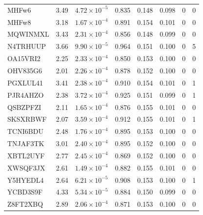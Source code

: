 \begin{landscape}
\begin{longtable}{lrcccccc}
MHFw6     & 3.49 & $4.72\times10^{-5}$ & 0.835 & 0.148 & 0.098 & 0 & 0 \\
MHFw8     & 3.18 & $1.67\times10^{-4}$ & 0.891 & 0.154 & 0.101 & 0 & 0 \\
MQWINMXL  & 3.43 & $2.31\times10^{-4}$ & 0.856 & 0.148 & 0.099 & 0 & 0 \\
N4TRHUUP  & 3.66 & $9.90\times10^{-5}$ & 0.964 & 0.151 & 0.100 & 0 & 5 \\
OA15VRI2  & 2.25 & $2.33\times10^{-4}$ & 0.850 & 0.153 & 0.100 & 0 & 0 \\
OHV835G6  & 2.01 & $2.26\times10^{-4}$ & 0.878 & 0.152 & 0.100 & 0 & 0 \\
PGXLUL41  & 3.41 & $2.38\times10^{-4}$ & 0.910 & 0.154 & 0.101 & 0 & 1 \\
PJR4AHZO  & 2.38 & $3.72\times10^{-4}$ & 0.925 & 0.151 & 0.099 & 0 & 1 \\
QSBZPFZI  & 2.11 & $1.65\times10^{-4}$ & 0.876 & 0.155 & 0.101 & 0 & 0 \\
SKSXRBWF  & 2.07 & $3.59\times10^{-4}$ & 0.912 & 0.155 & 0.101 & 0 & 1 \\
TCNI6BDU  & 2.48 & $1.76\times10^{-4}$ & 0.895 & 0.153 & 0.100 & 0 & 0 \\
TNJAF3TK  & 3.01 & $2.40\times10^{-4}$ & 0.895 & 0.152 & 0.100 & 0 & 0 \\
XBTL2UYF  & 2.77 & $2.45\times10^{-4}$ & 0.869 & 0.152 & 0.100 & 0 & 0 \\
XWSQF3JX  & 2.61 & $1.49\times10^{-4}$ & 0.882 & 0.155 & 0.101 & 0 & 0 \\
Y5HYEDL4  & 2.64 & $6.21\times10^{-5}$ & 0.908 & 0.153 & 0.100 & 0 & 1 \\
YCBD3S9F  & 4.33 & $5.34\times10^{-5}$ & 0.884 & 0.150 & 0.099 & 0 & 0 \\
Z8FT2XBQ  & 2.89 & $2.06\times10^{-4}$ & 0.871 & 0.153 & 0.100 & 0 & 0 \\
\end{longtable}
\end{landscape}
\fi
